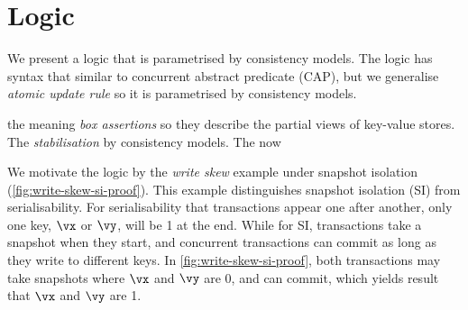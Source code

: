 \section{Logic}



We present a logic that is parametrised by consistency models.
The logic has syntax that similar to concurrent abstract predicate (CAP),
but we generalise \emph{atomic update rule} so it is parametrised by consistency models.




the meaning \emph{box assertions} so they describe the partial views of key-value stores.
The \emph{stabilisation} by consistency models.
The  now 


We motivate the logic by the \emph{write skew} example under snapshot isolation (\cref{fig:write-skew-si-proof}).
This example distinguishes snapshot isolation (SI) from serialisability.
For serialisability that transactions appear one after another, only one key, \( \vx \) or \( \vy \), will be 1 at the end.
While for SI, transactions take a snapshot when they start, and concurrent transactions can commit as long as they write to different keys.
In \cref{fig:write-skew-si-proof}, both transactions may take snapshots where \( \vx \) and \( \vy \) are 0, and can commit, 
which yields result that \( \vx \) and \( \vy \) are 1.

